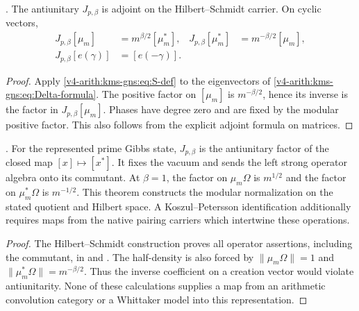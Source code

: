 \begin{proposition}
\label{v4-arith:kms-gns:prop:J-equals-sigma-BC}
\ClaimStatusProvedHere. The antiunitary $J_{p,\beta}$ is adjoint
on the Hilbert--Schmidt carrier. On cyclic vectors,
\begin{align}
 J_{p,\beta}[\mu_m]&=m^{\beta/2}[\mu_m^*],
       &J_{p,\beta}[\mu_m^*]&=m^{-\beta/2}[\mu_m],
       \label{v4-arith:kms-gns:eq:J-basis}\\
 J_{p,\beta}[e(\gamma)]&=[e(-\gamma)].
       \label{v4-arith:kms-gns:eq:J-on-algebra}
\end{align}
\end{proposition}

\begin{proof}
Apply \eqref{v4-arith:kms-gns:eq:S-def} to the eigenvectors of
\eqref{v4-arith:kms-gns:eq:Delta-formula}. The positive factor on
$[\mu_m]$ is $m^{-\beta/2}$, hence its inverse is the factor in
$J_{p,\beta}[\mu_m]$. Phases have degree zero and are fixed by
the modular positive factor. This also follows from the explicit
adjoint formula on matrices.
\end{proof}

\begin{theorem}
\label{v4-arith:kms-gns:thm:KMS1-GNS-BC-identification}
\ClaimStatusProvedHere. For the represented prime Gibbs state,
$J_{p,\beta}$ is the antiunitary factor of the closed map
$[x]\mapsto[x^*]$. It fixes the vacuum and sends the left strong
operator algebra onto its commutant. At $\beta=1$, the factor on
$\mu_m\Omega$ is $m^{1/2}$ and the factor on $\mu_m^*\Omega$
is $m^{-1/2}$. This theorem constructs the modular normalization
on the stated quotient and Hilbert space. A Koszul--Petersson
identification additionally requires maps from the native pairing
carriers which intertwine these operations.
\end{theorem}

\begin{proof}
The Hilbert--Schmidt construction proves all operator assertions,
including the commutant, in 
and . The half-density is also
forced by $\|\mu_m\Omega\|=1$ and
$\|\mu_m^*\Omega\|=m^{-\beta/2}$. Thus the inverse coefficient
on a creation vector would violate antiunitarity. None of these
calculations supplies a map from an arithmetic convolution category
or a Whittaker model into this representation.
\end{proof}

